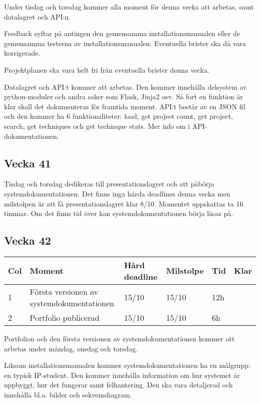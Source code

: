 \documentclass{TDP003mall}
\begin{document}
Under tisdag och torsdag kommer alla moment för denna vecka att arbetas, samt datalagret och API:n.

Feedback syftar på antingen den gemensamma installationsmanualen eller de gemensamma testerna av installationsmanualen. Eventuella brister ska då vara korrigerade.

Projektplanen ska vara helt fri från eventuella brister denna vecka.

Datalagret och API:t kommer att arbetas. Den kommer innehålla delsystem av python-moduler och andra saker som Flask, Jinja2 osv. Så fort en funktion är klar skall det dokumenteras för framtida moment. API:t består av en JSON fil och den kommer ha 6 funktionaliteter: load, get project count, get project, search, get techniques och get techinque stats. Mer info om i API-dokumentationen.

\subsection*{Vecka 41}
Tisdag och torsdag dedikeras till presentationslagret och att påbörja systemdokumentationen. Det finns inga hårda deadlines denna vecka men milstolpen är att få presentationslagret klar 8/10. Momentet uppskattas ta 16 timmar. Om det finns tid över kan systemdokumentationen börja läsas på.

\subsection*{Vecka 42}
\begin{table}[!h]
\begin{tabularx}{\linewidth}{|l|X|l|l|l|l|}
\hline
Col & Moment & Hård deadline & Milstolpe & Tid & Klar \\\hline
1 & Första versionen av systemdokumentationen & 15/10 & 15/10 & 12h \\\hline
2 & Portfolio publicerad & 15/10 & 15/10 & 6h \\\hline
\end{tabularx}
\end{table}

Portfolion och den första versionen av systemdokumentationen kommer att arbetas under måndag, onsdag och torsdag.

Liksom installationsmanualen kommer systemdokumentationen ha en målgrupp: en typisk IP-student. Den kommer innehålla information om hur systemet är uppbyggt, hur det fungerar samt felhantering. Den ska vara detaljerad och innehålla bl.a. bilder och sekvensdiagram.
\end{document}
